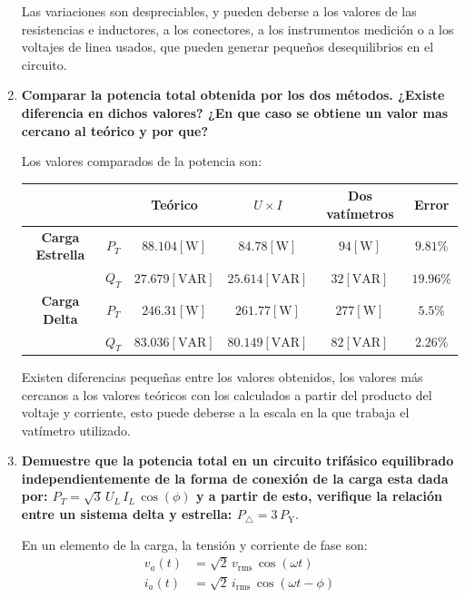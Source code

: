 \documentclass[letter,11pt]{article}
\begin{document}
\begin{enumerate}
Las variaciones son despreciables, y pueden deberse a los valores de las
resistencias e inductores, a los conectores, a los instrumentos medición o
a los voltajes de linea usados, que pueden generar pequeños desequilibrios en
el circuito.

\item \textbf{Comparar la potencia total obtenida por los dos métodos. ¿Existe
diferencia en dichos valores? ¿En que caso se obtiene un valor mas cercano al
teórico y por que?}

Los valores comparados de la potencia son:

\begin{center}
    \begin{tabular}{|c|c||c||c|c||c|}
    \hline
    \multicolumn{2}{|c||}{} &
    \textbf{Teórico} & $U{\times}I$ & \textbf{Dos vatímetros} & \textbf{Error}
    \tabularnewline \hline \hline
    \textbf{Carga Estrella} & $P_T$ &
    $88.104[\text{W}]$ & $84.78[\text{W}]$ & $94[\text{W}]$ & $9.81\%$
    \tabularnewline \hline
                   & $Q_T$ &
    $27.679[\text{VAR}]$ & $25.614[\text{VAR}]$ & $32[\text{VAR}]$ & $19.96\%$
    \tabularnewline \hline \hline
    \textbf{Carga Delta} & $P_T$ &
    $246.31[\text{W}]$ & $261.77[\text{W}]$ & $277[\text{W}]$ & $5.5\%$
    \tabularnewline \hline
                & $Q_T$ &
    $83.036[\text{VAR}]$ & $80.149[\text{VAR}]$ & $82[\text{VAR}]$ & $2.26\%$
    \tabularnewline \hline
    \end{tabular}
\end{center}

Existen diferencias pequeñas entre los valores obtenidos, los valores más
cercanos a los valores teóricos con los calculados a partir del producto del
voltaje y corriente, esto puede deberse a la escala en la que trabaja el
vatímetro utilizado.

\item \textbf{Demuestre que la potencia total en un circuito trifásico
equilibrado independientemente de la forma de conexión de la carga esta dada
por: $P_T = \sqrt{3}\,U_L\,I_L\,\cos(\phi)$ y a partir de esto, verifique la
relación entre un sistema delta y estrella: $P_{\triangle} = 3\,P_{\text{Y}}$}.

En un elemento de la carga, la tensión y corriente de fase son:
\begin{equation*}
    \begin{split}
        v_a(t) &= \sqrt{2}\,v_{\text{rms}}\,\cos(\omega{t})\\
        i_a(t) &= \sqrt{2}\,i_{\text{rms}}\,\cos(\omega{t} - \phi)\\
    \end{split}
\end{equation*}



\end{enumerate}
\end{document}
